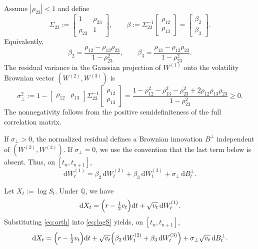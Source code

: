 \documentclass[pdflatex,sn-mathphys-num]{sn-jnl}
\theoremstyle{thmstyleone}%
\theoremstyle{thmstylethree}%
\theoremstyle{thmstyletwo}%
\newcommand{\dd}{\mathrm d}
\newcommand{\Q}{\mathbb Q}
\begin{document}
Assume $|\rho_{23}|<1$ and define
\[
\Sigma_{23}:=
\begin{bmatrix}
1 & \rho_{23}\\
\rho_{23} & 1
\end{bmatrix},
\qquad
\beta:=\Sigma_{23}^{-1}
\begin{bmatrix}
\rho_{12}\\
\rho_{13}
\end{bmatrix}
=
\begin{bmatrix}
\beta_2\\
\beta_3
\end{bmatrix}.
\]
Equivalently,
\begin{equation}\label{eq:proj-coeffs}
\beta_2=\frac{\rho_{12}-\rho_{13}\rho_{23}}{1-\rho_{23}^2},
\qquad
\beta_3=\frac{\rho_{13}-\rho_{12}\rho_{23}}{1-\rho_{23}^2}.
\end{equation}
The residual variance in the Gaussian projection of $W^{(1)}$ onto the volatility Brownian vector
$(W^{(2)},W^{(3)})$ is
\begin{equation}\label{eq:sigperp}
\sigma_\perp^2
:=1-\begin{bmatrix}\rho_{12}&\rho_{13}\end{bmatrix}\Sigma_{23}^{-1}
\begin{bmatrix}\rho_{12}\\ \rho_{13}\end{bmatrix}
=\frac{1-\rho_{12}^2-\rho_{13}^2-\rho_{23}^2+2\rho_{12}\rho_{13}\rho_{23}}{1-\rho_{23}^2}\ge 0.
\end{equation}
The nonnegativity follows from the positive semidefiniteness of the full correlation matrix.

If $\sigma_\perp>0$, the normalized residual defines a Brownian innovation $B^\perp$ independent of
$(W^{(2)},W^{(3)})$. If $\sigma_\perp=0$, we use the convention that the last term below is absent. Thus,
on $[t_n,t_{n+1}]$,
\begin{equation}\label{eq:orth}
\dd W^{(1)}_t=\beta_2\,\dd W^{(2)}_t+\beta_3\,\dd W^{(3)}_t+\sigma_\perp\,\dd B^\perp_t.
\end{equation}

Let $X_t:=\log S_t$. Under $\Q$, we have
\begin{equation}\label{eq:logS}
\dd X_t=\Bigl(r-\tfrac12 v_t\Bigr)\dd t+\sqrt{v_t}\,\dd W^{(1)}_t.
\end{equation}
Substituting \eqref{eq:orth} into \eqref{eq:logS} yields, on $[t_n,t_{n+1}]$,
\[
\dd X_t=\Bigl(r-\tfrac12 v_t\Bigr)\dd t
+\sqrt{v_t}\Bigl(\beta_2\,\dd W^{(2)}_t+\beta_3\,\dd W^{(3)}_t\Bigr)
+\sigma_\perp\sqrt{v_t}\,\dd B^\perp_t.
\]
\end{document}
